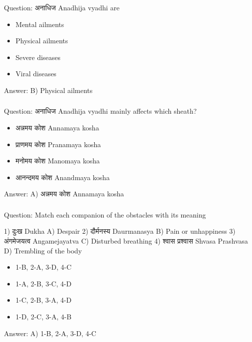 \begin{frame}[fragile]\frametitle{}

Question: अनाधिज Anadhija vyadhi are

\begin{itemize}
\item[A)] Mental ailments
\item[B)] Physical ailments
\item[C)] Severe diseases
\item[D)] Viral diseases
\end{itemize}

Answer: B) Physical ailments
\end{frame}

\begin{frame}[fragile]\frametitle{}

Question: अनाधिज Anadhija vyadhi mainly affects which sheath?

\begin{itemize}
\item[A)] अन्नमय कोश Annamaya kosha
\item[B)] प्राणमय कोश Pranamaya kosha
\item[C)] मनोमय कोश Manomaya kosha
\item[D)] आनन्दमय कोश Anandmaya kosha
\end{itemize}

Answer: A) अन्नमय कोश Annamaya kosha
\end{frame}

\begin{frame}[fragile]\frametitle{}

Question: Match each companion of the obstacles with its meaning

1) दुःख Dukha                            A) Despair
2) दौर्मनस्य Daurmanasya                    B) Pain or unhappiness
3) अंगमेजयत्व Angamejayatva                  C) Disturbed breathing
4) श्वास प्रश्वास Shvasa Prashvasa              D) Trembling of the body

\begin{itemize}
\item[A)] 1-B, 2-A, 3-D, 4-C
\item[B)] 1-A, 2-B, 3-C, 4-D
\item[C)] 1-C, 2-B, 3-A, 4-D
\item[D)] 1-D, 2-C, 3-A, 4-B
\end{itemize}

Answer: A) 1-B, 2-A, 3-D, 4-C
\end{frame}

